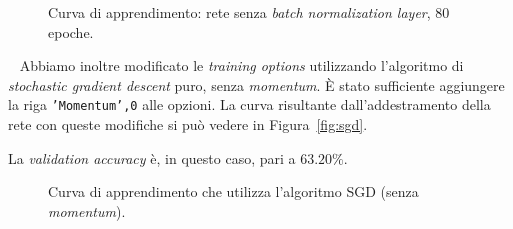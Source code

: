 \documentclass[a4paper,12pt]{article}
\begin{document}
\begin{figure}[htb]
    \hspace*{-2.1cm}
    \caption{Curva di apprendimento: rete senza \emph{batch normalization layer}, 80 epoche.}
    \label{fig:no-bn-80-epoch}
\end{figure}

\newpage ~ \newpage
Abbiamo inoltre modificato le \emph{training options} utilizzando l'algoritmo di \emph{stochastic gradient descent} puro, senza \emph{momentum}. È stato sufficiente aggiungere la riga \texttt{'Momentum',0} alle opzioni. La curva risultante dall'addestramento della rete con queste modifiche si può vedere in Figura~\vref{fig:sgd}.

La \emph{validation accuracy} è, in questo caso, pari a $63.20\%$.


\begin{figure}[htb]
    \hspace*{-2.1cm}
    \caption{Curva di apprendimento che utilizza l'algoritmo SGD (senza \emph{momentum}).}
    \label{fig:sgd}
\end{figure}
\end{document}
